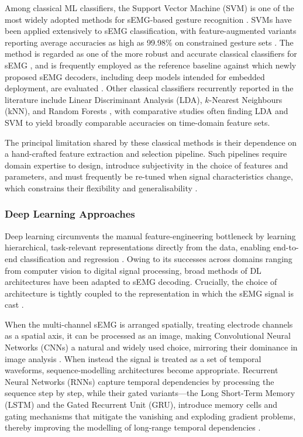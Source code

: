 \documentclass[12pt,DIV16,BCOR12mm,a4paper,footinclude=false,headinclude,parskip=half-,twoside,openright,cleardoublepage=empty,toc=index,bibliography=totoc,listof=totoc]{scrreprt}
\numberwithin{equation}{chapter}
\begin{document}
    Among classical ML classifiers, the Support Vector Machine (SVM) is one of the most widely adopted methods
    for sEMG-based gesture recognition \cite{niSurveyHandGesture2024}. SVMs have been applied extensively to sEMG
    classification, with feature-augmented variants reporting average
    accuracies as high as 99.98\% on constrained gesture sets \cite{t.HandGestureClassification2024}. The method
    is regarded as one of the more robust and accurate classical classifiers for sEMG
    \cite{mohapatraHandGestureClassification2024}, and is frequently employed as the reference baseline against
    which newly proposed sEMG decoders, including deep models intended for embedded
    deployment, are evaluated \cite{zanghieriRobustRealTimeEmbedded2020}. Other classical classifiers
    recurrently reported in the literature include Linear Discriminant Analysis (LDA), $k$-Nearest Neighbours
    (kNN), and Random Forests \cite{niSurveyHandGesture2024}, with comparative studies often finding LDA and SVM
    to yield broadly comparable accuracies on time-domain feature sets.

    The principal limitation shared by these classical methods is their dependence on a hand-crafted feature
    extraction and selection pipeline. Such pipelines require domain expertise to design, introduce subjectivity
    in the choice of features and parameters, and must frequently be re-tuned when signal characteristics change,
    which constrains their flexibility and generalisability \cite{niSurveyHandGesture2024}.

    \subsubsection{Deep Learning Approaches}

    Deep learning circumvents the manual feature-engineering bottleneck by learning hierarchical, task-relevant
    representations directly from the data, enabling end-to-end classification and regression
    \cite{zhongDeepFeatureLearning2026}. Owing to its successes across domains ranging from computer vision to
    digital signal processing, broad methods of DL architectures have been adapted to sEMG decoding. Crucially,
    the choice of architecture is tightly coupled to the representation in which the sEMG signal is cast
    \cite{zhongDeepFeatureLearning2026}.

    When the multi-channel sEMG is arranged spatially, treating electrode channels as a spatial axis, it can be
    processed as an image, making Convolutional Neural Networks (CNNs) a natural and widely used choice, mirroring
    their dominance in image analysis \cite{zhongDeepFeatureLearning2026}. When instead the signal is treated as a
    set of temporal waveforms, sequence-modelling architectures become appropriate. Recurrent Neural Networks (RNNs)
    capture temporal dependencies by processing the sequence step by step, while their gated variants---the Long
    Short-Term Memory (LSTM) and the Gated Recurrent Unit (GRU), introduce memory cells and gating mechanisms that
    mitigate the vanishing and exploding gradient problems, thereby improving the modelling of long-range temporal
    dependencies \cite{zhongDeepFeatureLearning2026}.
\end{document}
